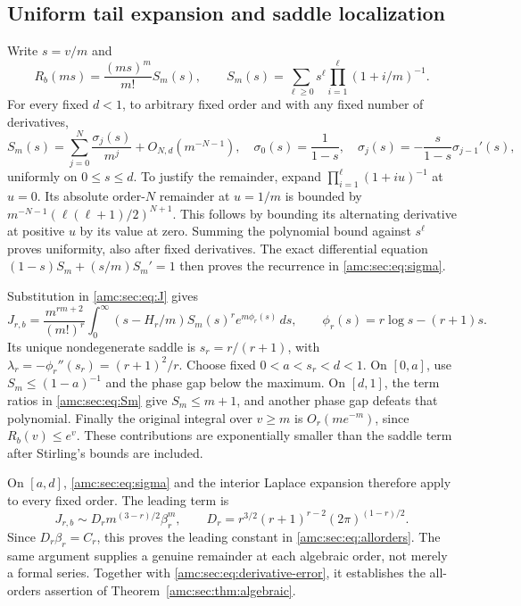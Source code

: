 \documentclass[11pt,letterpaper]{article}
\theoremstyle{remark}\newtheorem{remark}[theorem]{Remark}
\begin{document}
\subsection{Uniform tail expansion and saddle localization}
Write $s=v/m$ and
\begin{equation}\label{amc:sec:eq:Sm}
 R_b(ms)=\frac{(ms)^m}{m!}S_m(s),\qquad
 S_m(s)=\sum_{\ell\ge0}s^\ell\prod_{i=1}^{\ell}(1+i/m)^{-1}.
\end{equation}
For every fixed $d<1$, to arbitrary fixed order and with any fixed number of derivatives,
\begin{equation}\label{amc:sec:eq:sigma}
 S_m(s)=\sum_{j=0}^N\frac{\sigma_j(s)}{m^j}+O_{N,d}(m^{-N-1}),
 \quad \sigma_0(s)=\frac1{1-s},\quad
 \sigma_j(s)=-\frac{s}{1-s}\sigma_{j-1}'(s),
\end{equation}
uniformly on $0\le s\le d$. To justify the remainder, expand
$\prod_{i=1}^{\ell}(1+iu)^{-1}$ at $u=0$. Its absolute order-$N$ remainder at $u=1/m$ is bounded by
$m^{-N-1}(\ell(\ell+1)/2)^{N+1}$. This follows by bounding its alternating derivative at positive $u$ by its value at zero. Summing the polynomial bound against $s^\ell$ proves uniformity, also after fixed derivatives. The exact differential equation
$(1-s)S_m+(s/m)S_m'=1$ then proves the recurrence in \eqref{amc:sec:eq:sigma}.

Substitution in \eqref{amc:sec:eq:J} gives
\begin{equation}\label{amc:sec:eq:laplace}
 J_{r,b}=\frac{m^{rm+2}}{(m!)^r}
 \int_0^\infty (s-H_r/m)S_m(s)^r e^{m\phi_r(s)}\,ds,
 \qquad\phi_r(s)=r\log s-(r+1)s.
\end{equation}
Its unique nondegenerate saddle is $s_r=r/(r+1)$, with
$\lambda_r=-\phi_r''(s_r)=(r+1)^2/r$. Choose fixed $0<a<s_r<d<1$.
On $[0,a]$, use $S_m\le(1-a)^{-1}$ and the phase gap below the maximum. On $[d,1]$, the term ratios in \eqref{amc:sec:eq:Sm} give $S_m\le m+1$, and another phase gap defeats that polynomial. Finally the original integral over $v\ge m$ is $O_r(me^{-m})$, since $R_b(v)\le e^v$. These contributions are exponentially smaller than the saddle term after Stirling's bounds are included.

On $[a,d]$, \eqref{amc:sec:eq:sigma} and the interior Laplace expansion therefore apply to every fixed order. The leading term is
\[
 J_{r,b}\sim D_r m^{(3-r)/2}\beta_r^m,
 \qquad D_r=r^{3/2}(r+1)^{r-2}(2\pi)^{(1-r)/2}.
\]
Since $D_r\beta_r=C_r$, this proves the leading constant in \eqref{amc:sec:eq:allorders}. The same argument supplies a genuine remainder at each algebraic order, not merely a formal series. Together with \eqref{amc:sec:eq:derivative-error}, it establishes the all-orders assertion of Theorem~\ref{amc:sec:thm:algebraic}.
\end{document}
